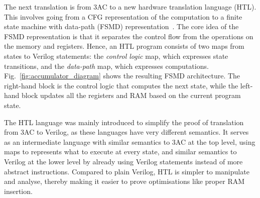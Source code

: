 The next translation is from 3AC to a new hardware translation language (HTL). %
This involves going from a CFG representation of the computation to a finite state machine with data-path (FSMD) representation~\cite{hwang99_fsmd}. The core idea of the FSMD representation is that it separates the control flow from the operations on the memory and registers. %
Hence, an HTL program consists of two maps from states to Verilog statements: the \emph{control logic} map, which expresses state transitions, and the \emph{data-path} map, which expresses computations.
Fig.~\ref{fig:accumulator_diagram} shows the resulting FSMD architecture. The right-hand block is the control logic that computes the next state, while the left-hand block updates all the registers and RAM based on the current program state.

The HTL language was mainly introduced to simplify the proof of translation from 3AC to Verilog, as these languages have very different semantics.
It serves as an intermediate language with similar semantics to 3AC at the top level, using maps to represents what to execute at every state, and similar semantics to Verilog at the lower level by already using Verilog statements instead of more abstract instructions.
Compared to plain Verilog, HTL is simpler to manipulate and analyse, thereby making it easier to prove optimisations like proper RAM insertion.

